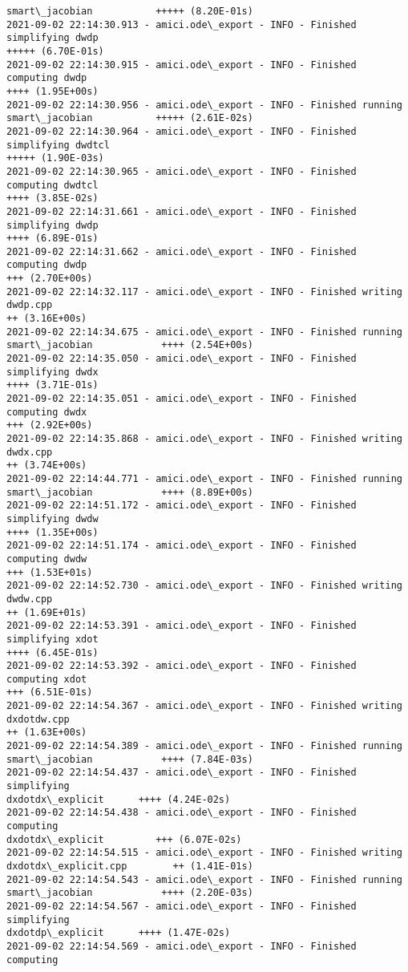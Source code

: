 \documentclass[11pt]{article}
\begin{document}
\begin{Verbatim}[commandchars=\\\{\}]
smart\_jacobian           +++++ (8.20E-01s)
2021-09-02 22:14:30.913 - amici.ode\_export - INFO - Finished simplifying dwdp
+++++ (6.70E-01s)
2021-09-02 22:14:30.915 - amici.ode\_export - INFO - Finished computing dwdp
++++ (1.95E+00s)
2021-09-02 22:14:30.956 - amici.ode\_export - INFO - Finished running
smart\_jacobian           +++++ (2.61E-02s)
2021-09-02 22:14:30.964 - amici.ode\_export - INFO - Finished simplifying dwdtcl
+++++ (1.90E-03s)
2021-09-02 22:14:30.965 - amici.ode\_export - INFO - Finished computing dwdtcl
++++ (3.85E-02s)
2021-09-02 22:14:31.661 - amici.ode\_export - INFO - Finished simplifying dwdp
++++ (6.89E-01s)
2021-09-02 22:14:31.662 - amici.ode\_export - INFO - Finished computing dwdp
+++ (2.70E+00s)
2021-09-02 22:14:32.117 - amici.ode\_export - INFO - Finished writing dwdp.cpp
++ (3.16E+00s)
2021-09-02 22:14:34.675 - amici.ode\_export - INFO - Finished running
smart\_jacobian            ++++ (2.54E+00s)
2021-09-02 22:14:35.050 - amici.ode\_export - INFO - Finished simplifying dwdx
++++ (3.71E-01s)
2021-09-02 22:14:35.051 - amici.ode\_export - INFO - Finished computing dwdx
+++ (2.92E+00s)
2021-09-02 22:14:35.868 - amici.ode\_export - INFO - Finished writing dwdx.cpp
++ (3.74E+00s)
2021-09-02 22:14:44.771 - amici.ode\_export - INFO - Finished running
smart\_jacobian            ++++ (8.89E+00s)
2021-09-02 22:14:51.172 - amici.ode\_export - INFO - Finished simplifying dwdw
++++ (1.35E+00s)
2021-09-02 22:14:51.174 - amici.ode\_export - INFO - Finished computing dwdw
+++ (1.53E+01s)
2021-09-02 22:14:52.730 - amici.ode\_export - INFO - Finished writing dwdw.cpp
++ (1.69E+01s)
2021-09-02 22:14:53.391 - amici.ode\_export - INFO - Finished simplifying xdot
++++ (6.45E-01s)
2021-09-02 22:14:53.392 - amici.ode\_export - INFO - Finished computing xdot
+++ (6.51E-01s)
2021-09-02 22:14:54.367 - amici.ode\_export - INFO - Finished writing dxdotdw.cpp
++ (1.63E+00s)
2021-09-02 22:14:54.389 - amici.ode\_export - INFO - Finished running
smart\_jacobian            ++++ (7.84E-03s)
2021-09-02 22:14:54.437 - amici.ode\_export - INFO - Finished simplifying
dxdotdx\_explicit      ++++ (4.24E-02s)
2021-09-02 22:14:54.438 - amici.ode\_export - INFO - Finished computing
dxdotdx\_explicit         +++ (6.07E-02s)
2021-09-02 22:14:54.515 - amici.ode\_export - INFO - Finished writing
dxdotdx\_explicit.cpp        ++ (1.41E-01s)
2021-09-02 22:14:54.543 - amici.ode\_export - INFO - Finished running
smart\_jacobian            ++++ (2.20E-03s)
2021-09-02 22:14:54.567 - amici.ode\_export - INFO - Finished simplifying
dxdotdp\_explicit      ++++ (1.47E-02s)
2021-09-02 22:14:54.569 - amici.ode\_export - INFO - Finished computing

\end{Verbatim}
\end{document}
